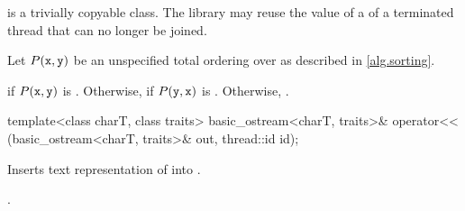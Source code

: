 \documentclass{wg21}
\begin{document}
\pnum
{} is a trivially copyable class.
The library may reuse the value of a  of a terminated thread that can no longer be joined.


\begin{itemdescr}
    \pnum
    Let $P(\texttt{x}, \texttt{y})$ be
    an unspecified total ordering over 
    as described in \ref{alg.sorting}.

    \pnum
    \returns
     if $P(\texttt{x}, \texttt{y})$ is .
    Otherwise, 
    if $P(\texttt{y}, \texttt{x})$ is .
    Otherwise, .
\end{itemdescr}

%
\begin{itemdecl}
    template<class charT, class traits>
    basic_ostream<charT, traits>&
    operator<< (basic_ostream<charT, traits>& out, thread::id id);
\end{itemdecl}

\begin{itemdescr}
    \pnum
    \effects
    Inserts  text representation of  into
    . 

    \pnum
    \returns
    .
\end{itemdescr}
\end{document}
